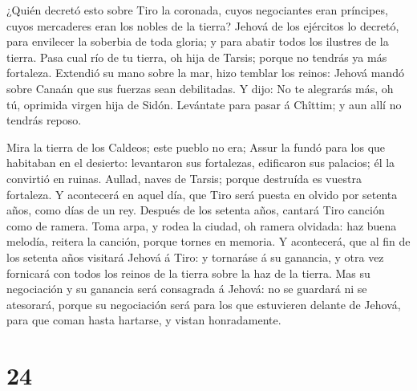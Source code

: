  ¿Quién decretó esto sobre Tiro la coronada, cuyos
negociantes eran príncipes, cuyos mercaderes eran los nobles de la
tierra?  Jehová de los ejércitos lo decretó, para envilecer
la soberbia de toda gloria; y para abatir todos los ilustres de la
tierra.  Pasa cual río de tu tierra, oh hija de Tarsis;
porque no tendrás ya más fortaleza.  Extendió su mano sobre
la mar, hizo temblar los reinos: Jehová mandó sobre Canaán que sus
fuerzas sean debilitadas.  Y dijo: No te alegrarás más, oh
tú, oprimida virgen hija de Sidón. Levántate para pasar á Chîttim; y aun
allí no tendrás reposo.

 Mira la tierra de los Caldeos; este pueblo no era; Assur
la fundó para los que habitaban en el desierto: levantaron sus
fortalezas, edificaron sus palacios; él la convirtió en ruinas.
 Aullad, naves de Tarsis; porque destruída es vuestra
fortaleza.  Y acontecerá en aquel día, que Tiro será puesta
en olvido por setenta años, como días de un rey. Después de los setenta
años, cantará Tiro canción como de ramera.  Toma arpa, y
rodea la ciudad, oh ramera olvidada: haz buena melodía, reitera la
canción, porque tornes en memoria.  Y acontecerá, que al
fin de los setenta años visitará Jehová á Tiro: y tornaráse á su
ganancia, y otra vez fornicará con todos los reinos de la tierra sobre
la haz de la tierra.  Mas su negociación y su ganancia será
consagrada á Jehová: no se guardará ni se atesorará, porque su
negociación será para los que estuvieren delante de Jehová, para que
coman hasta hartarse, y vistan honradamente.

\hypertarget{section-23}{%
\section{24}\label{section-23}}

